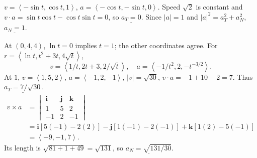 \documentclass[10pt]{article}
\newcommand{\ex}[1]{\par\addvspace{6pt}\noindent\llap{\makebox[.62in][r]{\large\bfseries #1.\hspace{.12in}}}\ignorespaces}
\newcommand{\ans}[1]{\underline{#1}}
\newcommand{\vv}[1]{\left\langle #1\right\rangle}
\newcommand{\ii}{\mathbf i}\newcommand{\jj}{\mathbf j}\newcommand{\kk}{\mathbf k}
\newcommand{\cp}[6]{\begin{vmatrix}\ii&\jj&\kk\\#1&#2&#3\\#4&#5&#6\end{vmatrix}}
\begin{document}
\ex{39}
$v=\vv{-\sin t,\cos t,1}$, $a=\vv{-\cos t,-\sin t,0}$. Speed $\sqrt2$ is constant and $v\cdot a=\sin t\cos t-\cos t\sin t=0$, so $\ans{a_T=0}$. Since $|a|=1$ and $|a|^2=a_T^2+a_N^2$, $\ans{a_N=1}$.
\ex{41}
At $(0,4,4)$, $\ln t=0$ implies $t=1$; the other coordinates agree. For $r=\vv{\ln t,t^2+3t,4\sqrt t}$,
\[v=\vv{1/t,2t+3,2/\sqrt t},\quad a=\vv{-1/t^2,2,-t^{-3/2}}.\]
At $1$, $v=\vv{1,5,2}$, $a=\vv{-1,2,-1}$, $|v|=\sqrt{30}$, $v\cdot a=-1+10-2=7$. Thus $\ans{a_T=7/\sqrt{30}}$.
\begin{align*}v\times a&=\cp{1}{5}{2}{-1}{2}{-1}\\&=\ii[5(-1)-2(2)]-\jj[1(-1)-2(-1)]+\kk[1(2)-5(-1)]\\&=\vv{-9,-1,7}.
\end{align*}
Its length is $\sqrt{81+1+49}=\sqrt{131}$, so $\ans{a_N=\sqrt{131/30}}$.
\end{document}
